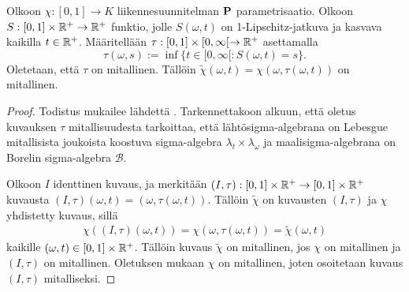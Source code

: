 \documentclass[12pt,oneside,a4paper]{amsbook} %
\begin{document}
\begin{lemma}\label{le:parametrizeLemma}
    Olkoon $\chi : [0, 1] \to K$ liikennesuunnitelman $\P$ parametrisaatio. Olkoon $S:[0,1]\times \Rp \to \Rp$ funktio, jolle $S(\omega, t)$ on 1-Lipschitz-jatkuva ja kasvava kaikilla $t \in \Rp$. Määritellään $\tau:[0, 1] \times [0, \infty [ \to \Rp$ asettamalla
    \begin{equation*}
        \tau(\omega, s) := \inf \{t \in [0, \infty[ : S(\omega, t) = s\}.
    \end{equation*}
    Oletetaan, että $\tau$ on mitallinen. Tällöin $\tilde\chi(\omega, t) = \chi(\omega, \tau(\omega, t))$ on mitallinen.
\end{lemma}
\begin{proof}
    Todistus mukailee lähdettä \cite[s.44]{optimal}. Tarkennettakoon alkuun, että oletus kuvauksen $\tau$ mitallisuudesta tarkoittaa, että lähtösigma-algebrana on Lebesgue mitallisista joukoista koostuva sigma-algebra $\lambda_t \times \lambda_\omega$ ja maalisigma-algebrana on Borelin sigma-algebra $\mathcal{B}$.
    
    Olkoon $I$ identtinen kuvaus, ja merkitään $(I, \tau) : [0, 1] \times \Rp \to [0, 1] \times \Rp $  kuvausta $(I, \tau)(\omega, t) = (\omega, \tau(\omega, t))$. Tällöin $\tilde \chi$ on kuvausten $(I, \tau)$ ja $\chi$ yhdistetty kuvaus, sillä
    \begin{align*}
        \chi((I, \tau)(\omega, t)) = \chi(\omega, \tau(\omega, t)) = \tilde \chi(\omega, t)
    \end{align*}
    kaikille $(\omega, t) \in [0, 1] \times \Rp$. Tällöin kuvaus $\tilde \chi$ on mitallinen, jos $\chi$ on mitallinen ja $(I, \tau)$ on mitallinen. Oletuksen mukaan $\chi$ on mitallinen, joten osoitetaan kuvaus $(I, \tau)$ mitalliseksi.
    

\end{proof}
\end{document}
